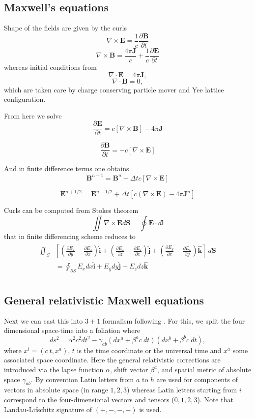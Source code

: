 \documentclass{aa}
\newcommand{\be}{\begin{equation}}
\newcommand{\ee}{\end{equation}}
\renewcommand{\vec}[1]{\ensuremath{\boldsymbol{#1}}}
\newcommand{\dt}{\ensuremath{\Delta t}}
\begin{document}
\subsection{Maxwell's equations}

Shape of the fields are given by the curls
\be
\nabla \times \vec{E} = \frac{1}{c} \frac{\partial \vec{B}} {\partial t}
\ee
\be
\nabla \times \vec{B} = \frac{4 \pi \vec{J}}{c} + \frac{1}{c} \frac{\partial \vec{E}} {\partial t}
\ee
whereas initial conditions from
\be
\nabla \cdot \vec{E} = 4\pi\vec{J},
\ee
\be
\nabla \cdot \vec{B} = 0,
\ee
which are taken care by charge conserving particle mover and Yee lattice configuration.

From here we solve
\be
\frac{\partial \vec{E}}{\partial t} = c [ \nabla \times \vec{B}] - 4\pi \vec{J}
\ee

\be
\frac{\partial \vec{B}}{\partial t} = -c[ \nabla \times \vec{E}]
\ee

And in finite difference terms one obtains 
\be
\vec{B}^{n+1} = \vec{B}^n - \dt c [\nabla \times \vec{E}]
\ee

\be
\vec{E}^{n+1/2} = \vec{E}^{n-1/2} + \dt [c(\nabla \times \vec{E}) - 4\pi \vec{J}^n]
\ee

Curls can be computed from Stokes theorem
\be
\iint \nabla \times \vec{E} d\vec{S} = \oint \vec{E} \cdot d\vec{l}
\ee
that in finite differencing scheme reduces to 
\begin{align}\begin{split}
\iint_{S}& \left[  \left( \frac{\partial E_z}{\partial y} - \frac{\partial E_x}{\partial x} \right) \vec{\hat{i}} + 
\left( \frac{\partial E_x}{\partial z} - \frac{\partial E_z}{\partial x} \right) \vec{\hat{j}} + 
\left( \frac{\partial E_y}{\partial x} - \frac{\partial E_x}{\partial y} \right) \vec{\hat{k}} \right] ~d\vec{S} \\
&= \oint_{\partial S} E_x dx \vec{\hat{i}} +  E_y dy \vec{\hat{j}} + E_z dz \vec{\hat{k}} \\
\end{split}\end{align}

\subsection{General relativistic Maxwell equations}
Next we can cast this into $3+1$ formalism following \citealt{P15}.
For this, we split the four dimensional space-time into a foliation where 
\be
ds^2 = \alpha^2 c^2 dt^2 - \gamma_{ab}(dx^a + \beta^a c~dt)(dx^b + \beta^b c~dt),
\ee
where $x^i = (c~t, x^a)$, $t$ is the time coordinate or the universal time and $x^a$ some associated space coordinate.
Here the general relativistic corrections are introduced via the lapse function $\alpha$, shift vector $\beta^a$, and spatial metric of absolute space $\gamma_{ab}$.
By convention Latin letters from $a$ to $h$ are used for components of vectors in absolute space (in range ${1,2,3}$) whereas Latin letters starting from $i$ correspond to the four-dimensional vectors and tensors (${0,1,2,3}$).
Note that Landau-Lifschitz signature of $(+,-,-,-)$ is used.
\end{document}
